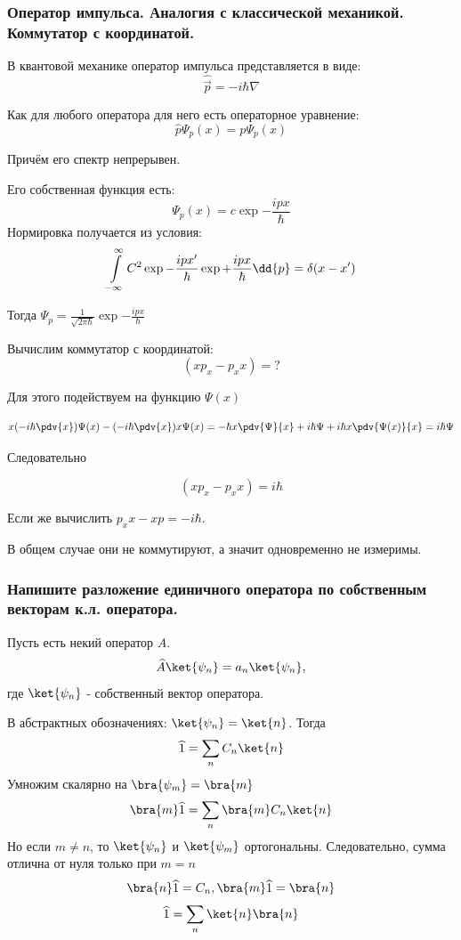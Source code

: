 \subsubsection{ {Оператор импульса. Аналогия с классической механикой. Коммутатор с
координатой.} }

В квантовой механике оператор импульса представляется в виде:
$$\hat{ \vec p}= -i\hbar\nabla $$

Как для любого оператора для него есть операторное уравнение: 
$$\hat p \Psi_p(x)=p\Psi_p(x) $$

Причём его спектр непрерывен.

Его собственная функция есть:
$$\Psi_p(x)=c\exp{-\frac{ipx}{\hbar}} $$
Нормировка получается из условия:
$$\infint C^2\exp{{-\frac{ipx'}{\hbar}}}\exp{+{\frac{ipx}{\hbar}}}\dd{p}=\delta(x-x') $$

Тогда $\Psi_p=\frac{1}{\sqrt{2\pi\hbar}}\exp{-\frac{ipx}{\hbar}}$

Вычислим коммутатор с координатой:
$$(xp_x-p_xx)=? $$

Для этого подействуем на функцию $\Psi(x)$

$$x(-i\hbar\pdv{x})\Psi(x)-(-i\hbar\pdv{x})x\Psi(x)=-\hbar x \pdv{\Psi}{x}+i\hbar\Psi+i\hbar x \pdv{\Psi(x)}{x}=i\hbar\Psi $$

Следовательно

$$(xp_x-p_xx)=i\hbar$$

Если же вычислить $p_xx-xp=-i\hbar$.

В общем случае они не коммутируют, а значит одновременно не измеримы.

\subsubsection{Напишите разложение единичного оператора по собственным векторам к.л. оператора.}


Пусть есть некий оператор $\widehat{A}$.
$$\widehat{A}\ket{\psi_n} = a_n \ket{\psi_n},$$
где $\ket{\psi_n}$ - собственный вектор оператора.

В абстрактных обозначениях: $\ket{\psi_n} = \ket{n}$. Тогда
$$\widehat{1}=\sum_n C_n \ket{n}$$
Умножим скалярно на $\bra{\psi_m} = \bra{m}$
$$\bra{m} \widehat{1}=\sum_n \bra{m} C_n \ket{n}$$
Но если $m\neq n$, то $\ket{\psi_n}$ и $\ket{\psi_m}$ ортогональны. Следовательно, сумма отлична от нуля только при $m=n$ 
$$\bra{n} \widehat{1}=C_n, \bra{m}\widehat{1}=\bra{n}$$
$$\widehat{1}=\sum_n \ket{n} \bra{n}$$

